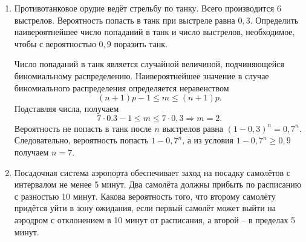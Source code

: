 \begin{enumerate}
    \item Противотанковое орудие ведёт стрельбу по танку. Всего производится 6
        выстрелов. Вероятность попасть в танк при выстреле равна \( 0,3 \).
        Определить наивероятнейшее число попаданий в танк и число выстрелов,
        необходимое, чтобы с вероятностью \( 0,9 \) поразить танк.

        Число попаданий в танк является случайной величиной, подчиняющейся
        биномиальному распределению. Наивероятнейшее значение в случае
        биномиального распределения определяется неравенством
        \[
            (n+1)p - 1 \le m \le (n+1)p.
        \]
        Подставляя числа, получаем
        \[
            7\cdot0.3 - 1 \le m \le 7\cdot0,3 \Rightarrow m = 2.
        \]
        Вероятность не попасть в танк после \( n \) выстрелов равна
        \( (1 - 0,3)^n = 0,7^n \). Следовательно, вероятность попасть
        \( 1 - 0,7^n \), а из условия \( 1 - 0,7^n \ge 0,9 \) получаем
        \( n = 7 \).

    \item Посадочная система аэропорта обеспечивает заход на посадку самолётов с
        интервалом не менее 5 минут. Два самолёта должны прибыть по расписанию с
        разностью 10 минут. Какова вероятность того, что второму самолёту
        придётся уйти в зону ожидания, если первый самолёт может выйти на
        аэродром с отклонением в 10 минут от расписания, а второй -- в пределах
        5 минут.
\end{enumerate}
